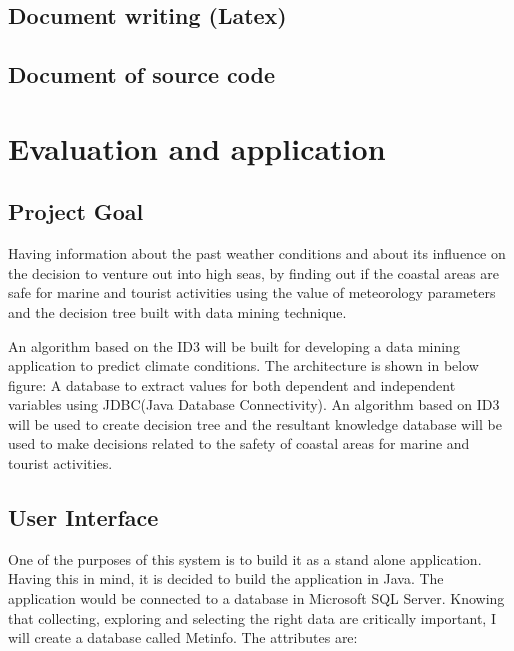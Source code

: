 \documentclass{article}
\begin{document}
\subsection{Document writing (Latex)}
\label{sec:latex}





\subsection{Document of source code}
\label{sec:documentsource}
\pagebreak

\section{Evaluation and application}
\label{sec:eval}

\subsection{Project Goal}
\label{sec:goal}

Having information about the past weather conditions and about its influence on the decision to venture out into high
seas, by finding out if the coastal areas are safe for marine and tourist activities using the value of meteorology parameters and the decision tree built with data mining technique.

An algorithm based on the ID3 will be built for developing a data mining application to predict climate conditions.
The architecture is shown in below figure: A database to extract values for both dependent and independent variables using JDBC(Java Database Connectivity).
An algorithm based on ID3 will be used to create decision tree and the resultant knowledge database will be used to make decisions related to the safety of coastal areas for marine and tourist activities.

\subsection{User Interface}
One of the purposes of this system is to build it as a stand alone application. Having this in mind, it is decided to build the application in Java. The application would be connected to a database in Microsoft SQL Server. Knowing that collecting, exploring and selecting the right data are critically important, I will create a database called Metinfo.
The attributes are:
\end{document}

